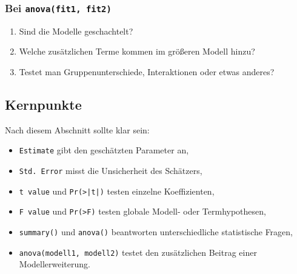 \documentclass[10pt, letterpaper]{article}
\begin{document}
\subsubsection*{Bei \texttt{anova(fit1, fit2)}}
\begin{enumerate}
    \item Sind die Modelle geschachtelt?
    \item Welche zusätzlichen Terme kommen im größeren Modell hinzu?
    \item Testet man Gruppenunterschiede, Interaktionen oder etwas anderes?
\end{enumerate}

\subsection{Kernpunkte}

Nach diesem Abschnitt sollte klar sein:
\begin{itemize}
    \item \texttt{Estimate} gibt den geschätzten Parameter an,
    \item \texttt{Std. Error} misst die Unsicherheit des Schätzers,
    \item \texttt{t value} und \texttt{Pr(>|t|)} testen einzelne Koeffizienten,
    \item \texttt{F value} und \texttt{Pr(>F)} testen globale Modell- oder Termhypothesen,
    \item \texttt{summary()} und \texttt{anova()} beantworten unterschiedliche statistische Fragen,
    \item \texttt{anova(modell1, modell2)} testet den zusätzlichen Beitrag einer Modellerweiterung.
\end{itemize}

\pagebreak
\printbibliography
\end{document}
